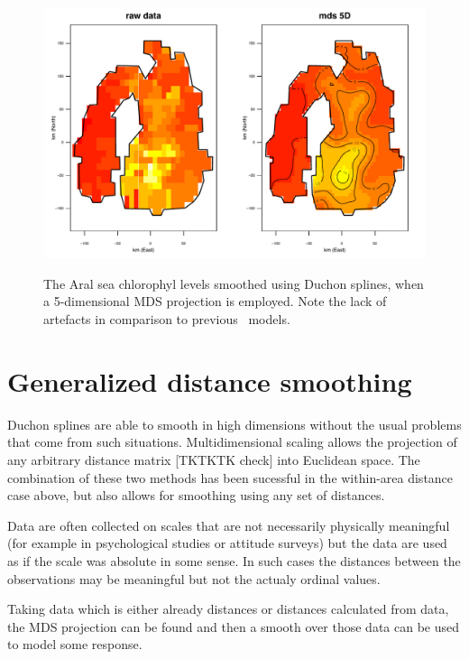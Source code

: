 \begin{figure}
\centering
\includegraphics[width=6in]{mds/figs/aral-5d-duchon.pdf} \\
\caption{The Aral sea chlorophyl levels smoothed using Duchon splines, when a 5-dimensional MDS projection is employed. Note the lack of artefacts in comparison to previous \mdsap\ models.}
\label{mds-aral-5d-duchon}
\end{figure}



\section{Generalized distance smoothing}
\label{gds-gds-examples}

Duchon splines are able to smooth in high dimensions without the usual problems that come from such situations. Multidimensional scaling allows the projection of any arbitrary distance matrix [TKTKTK check] into Euclidean space. The combination of these two methods has been sucessful in the within-area distance case above, but also allows for smoothing using any set of distances.

Data are often collected on scales that are not necessarily physically meaningful (for example in psychological studies or attitude surveys) but the data are used as if the scale was absolute in some sense. In such cases the distances between the observations may be meaningful but not the actualy ordinal values.

Taking data which is either already distances or distances calculated from data, the MDS projection can be found and then a smooth over those data can be used to model some response.

